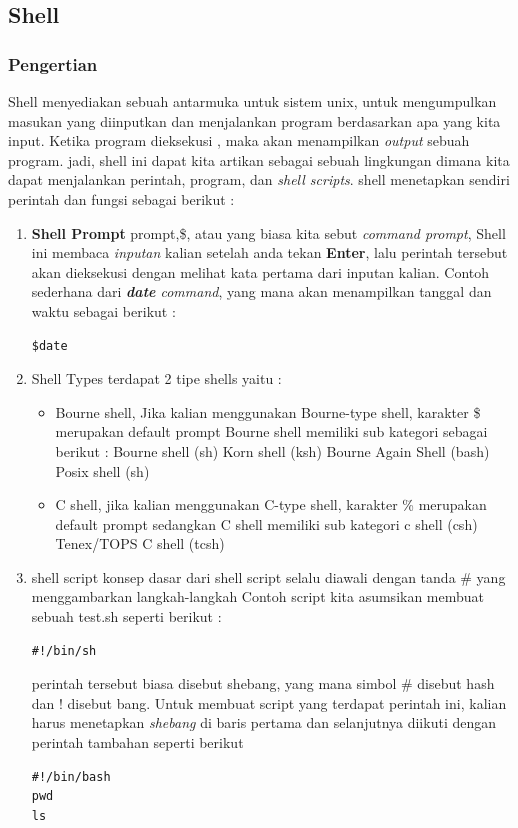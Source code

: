 \subsection{Shell}
\subsubsection{Pengertian}
Shell menyediakan sebuah antarmuka untuk sistem unix, untuk mengumpulkan masukan yang diinputkan dan menjalankan program berdasarkan apa yang kita input. Ketika program dieksekusi , maka akan menampilkan \textit{output} sebuah program. 
jadi, shell ini dapat kita artikan sebagai sebuah lingkungan dimana kita dapat menjalankan perintah, program, dan \textit{shell scripts}.
shell menetapkan sendiri perintah dan fungsi sebagai berikut :
\begin{enumerate}
\item \textbf{Shell Prompt}
prompt,\$, atau yang biasa kita sebut \textit{command prompt}, Shell ini membaca \textit{inputan} kalian setelah anda tekan \textbf{Enter}, lalu perintah tersebut akan dieksekusi dengan melihat kata pertama dari inputan kalian.
Contoh sederhana dari \textit{\textbf{date} command}, yang mana akan menampilkan tanggal dan waktu sebagai berikut :
\begin{verbatim}
$date
\end{verbatim}

\item{Shell Types}
terdapat 2 tipe shells yaitu :
\begin{itemize}
\item Bourne shell, Jika kalian menggunakan Bourne-type shell, karakter \$ merupakan default prompt 
Bourne shell memiliki sub kategori sebagai berikut :
\subitem Bourne shell (sh)
\subitem Korn shell (ksh)
\subitem Bourne Again Shell (bash)
\subitem Posix shell (sh)
\item C shell, jika kalian menggunakan C-type shell, karakter \% merupakan default prompt
 sedangkan C shell memiliki sub kategori 
\subitem c shell (csh)
\subitem Tenex/TOPS C shell (tcsh)
\end{itemize}

\item{shell script}
konsep dasar dari shell script selalu diawali dengan tanda \# yang menggambarkan langkah-langkah
Contoh script 
kita asumsikan membuat sebuah test.sh seperti berikut :
\begin{verbatim}
#!/bin/sh
\end{verbatim}
perintah tersebut biasa disebut shebang, yang mana simbol \# disebut hash dan ! disebut bang.
Untuk membuat script yang terdapat perintah ini, kalian harus menetapkan \textit{shebang} di baris pertama dan selanjutnya diikuti dengan perintah tambahan seperti berikut
\begin{verbatim}
#!/bin/bash
pwd
ls
\end{verbatim}
\end{enumerate}
